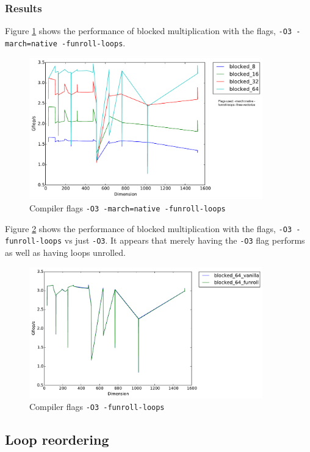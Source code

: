 \documentclass[11pt]{article}
\begin{document}
\subsubsection{Results}
Figure \ref{all_optimized_blocked} shows the performance of blocked multiplication with the flags, \texttt{-O3 -march=native -funroll-loops}.
\begin{figure}[H]
    \includegraphics[width=0.9\textwidth]{timing_flags_blocked.pdf}
    \caption{Compiler flags \texttt{-O3 -march=native -funroll-loops}}
    \label{all_optimized_blocked}
\end{figure} 

Figure \ref{funroll_vanilla} shows the performance of blocked multiplication with the flags, \texttt{-O3 -funroll-loops} vs just \texttt{-O3}. It appears that merely having the \texttt{-O3} flag performs as well as having loops unrolled. 
\begin{figure}[H]
    \includegraphics[width=0.9\textwidth]{timing_funroll_vanilla.pdf}
    \caption{Compiler flags \texttt{-O3 -funroll-loops}}
    \label{funroll_vanilla}
\end{figure} 


\subsection{Loop reordering}
\end{document}
